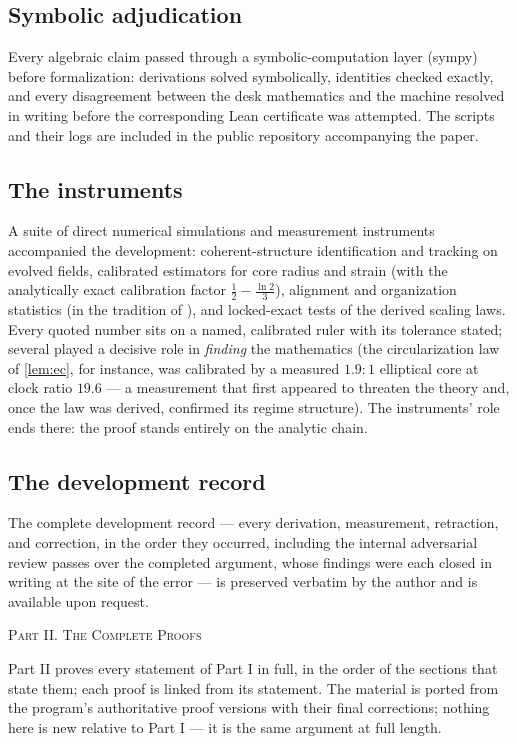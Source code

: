 \documentclass[11pt,letterpaper]{amsart}
\theoremstyle{definition}
\theoremstyle{remark}
\begin{document}
\subsection{Symbolic adjudication}\label{subsec:sympy}
Every algebraic claim passed through a symbolic-computation layer (sympy) before
formalization: derivations solved symbolically, identities checked exactly, and every
disagreement between the desk mathematics and the machine resolved in writing before
the corresponding Lean certificate was attempted. The scripts and their logs are
included in the public repository accompanying the paper.

\subsection{The instruments}\label{subsec:instruments}
A suite of direct numerical simulations and measurement instruments accompanied the
development: coherent-structure identification and tracking on evolved fields,
calibrated estimators for core radius and strain (with the analytically exact
calibration factor $\tfrac12-\tfrac{\ln2}{3}$), alignment and organization
statistics (in the tradition of \cite{Ashurst1987}), and locked-exact tests of the
derived scaling laws. Every quoted number
sits on a named, calibrated ruler with its tolerance stated; several played a
decisive role in \emph{finding} the mathematics (the circularization law of
\cref{lem:ec}, for instance, was calibrated by a measured $1.9{:}1$ elliptical core at
clock ratio $19.6$ --- a measurement that first appeared to threaten the theory and,
once the law was derived, confirmed its regime structure). The instruments' role ends
there: the proof stands entirely on the analytic chain.

\subsection{The development record}\label{subsec:record}
The complete development record --- every derivation, measurement, retraction, and
correction, in the order they occurred, including the internal adversarial review
passes over the completed argument, whose findings were each closed in writing at the
site of the error --- is preserved verbatim by the author and is available upon
request.

\newpage
\begin{center}
{\large\scshape Part II. The Complete Proofs}\medskip

\begin{minipage}{0.86\textwidth}\small
Part II proves every statement of Part I in full, in the order of the sections that
state them; each proof is linked from its statement. The material is ported from the
program's authoritative proof versions with their final corrections; nothing here is
new relative to Part I --- it is the same argument at full length.
\end{minipage}
\end{center}
\bigskip
\end{document}
